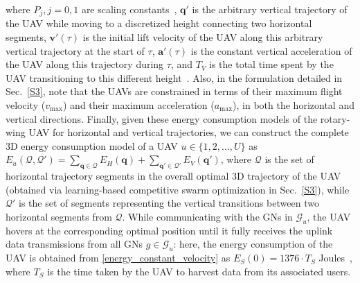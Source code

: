 \documentclass[10pt, twocolumn]{IEEEtran}
\begin{document}
where $P_{j},j{=}0,1$ are scaling constants~\cite{UAV_Propulsion_1}, $\mathbf{q}'$ is the arbitrary vertical trajectory of the UAV while moving to a discretized height connecting two horizontal segments, $\mathbf{v}'(\tau)$ is the initial lift velocity of the UAV along this arbitrary vertical trajectory at the start of $\tau$, $\mathbf{a}'(\tau)$ is the constant vertical acceleration of the UAV along this trajectory during $\tau$, and $T_{V}$ is the total time spent by the UAV transitioning to this different height~\cite{UAV_Propulsion_1}. Also, in the formulation detailed in Sec.~\ref{S3}, note that the UAVs are constrained in terms of their maximum flight velocity ($v_{\mathrm{max}}$) and their maximum acceleration ($a_{\mathrm{max}}$), in both the horizontal and vertical directions. Finally, given these energy consumption models of the rotary-wing UAV for horizontal and vertical trajectories, we can construct the complete $3$D energy consumption model of a UAV $u{\in}\{1,2,{\dots},U\}$ as $E_{u}(\mathcal{Q},\mathcal{Q}'){=}\sum_{\mathbf{q}{\in}\mathcal{Q}}E_{H}(\mathbf{q}){+}\sum_{\mathbf{q}'{\in}\mathcal{Q}'}E_{V}(\mathbf{q}')$, where $\mathcal{Q}$ is the set of horizontal trajectory segments in the overall optimal $3$D trajectory of the UAV (obtained via learning-based competitive swarm optimization in Sec.~\ref{S3}), while $\mathcal{Q}'$ is the set of segments representing the vertical transitions between two horizontal segments from $\mathcal{Q}$. While communicating with the GNs in $\mathcal{G}_{u}$, the UAV hovers at the corresponding optimal position until it fully receives the uplink data transmissions from all GNs $g{\in}\mathcal{G}_{u}$: here, the energy consumption of the UAV is obtained from \eqref{energy_constant_velocity} as $E_{S}(0){=}1376{\cdot}T_{S}$ Joules~\cite{UAV_Propulsion_1}, where $T_{S}$ is the time taken by the UAV to harvest data from its associated users.
\vspace{-6mm}
\end{document}
